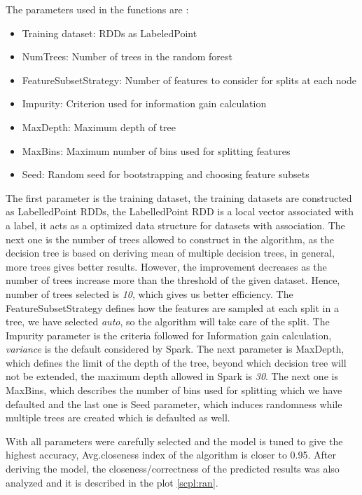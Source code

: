 \documentclass[sigconf]{acmart}
\begin{document}
The parameters used in the functions are \cite{api:docs} :
\begin{itemize}
\item Training dataset: RDDs as LabeledPoint
\item NumTrees: Number of trees in the random forest
\item FeatureSubsetStrategy: Number of features to consider for splits at each node
\item Impurity: Criterion used for information gain calculation 
\item MaxDepth: Maximum depth of tree
\item MaxBins: Maximum number of bins used for splitting features
\item Seed: Random seed for bootstrapping and choosing feature subsets
\end{itemize}

The first parameter is the training dataset, the training datasets are constructed as LabelledPoint RDDs, the LabelledPoint RDD is a local vector associated with a label, it acts as a optimized data structure for datasets with association. The next one is the number of trees allowed to construct in the algorithm, as the decision tree is based on deriving mean of multiple decision trees, in general, more trees gives better results. However, the improvement decreases as the number of trees increase more than the threshold of the given dataset. Hence, number of trees selected is {\em 10}, which gives us better efficiency. The FeatureSubsetStrategy defines how the features are sampled at each split in a tree, we have selected {\em auto}, so the algorithm will take care of the split. The Impurity parameter is the criteria followed for Information gain calculation, {\em variance} is the default considered by Spark. The next parameter is MaxDepth, which defines the limit of the depth of the tree, beyond which decision tree will not be extended, the maximum depth allowed in Spark is {\em 30}. The next one is MaxBins, which describes the number of bins used for splitting which we have defaulted and the last one is Seed parameter, which induces randomness while multiple trees are created which is defaulted as well.

With all parameters were carefully selected and the model is tuned to give the highest accuracy, Avg.closeness index of the algorithm is closer to 0.95. After deriving the model, the closeness/correctness of the predicted results was also analyzed and it is described in the plot \ref{scpl:ran}.
\end{document}
